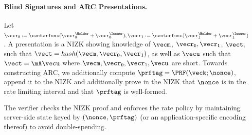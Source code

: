 	
	
\paragraph{Blind Signatures and ARC Presentations.}
Let $\vecr_0:=\centerfunc(\vecr_0^\Holder+\vecr_0^\Issuer),\vecr_1:=\centerfunc(\vecr_1^\Holder+\vecr_1^\Issuer)$. A presentation is a NIZK showing knowledge of $\vecm$, $\vecr_0,\vecr_1$, $\vect$,  such that  $\vect=hash(\vecm,\vecr_0,\vecr_1)$, as well as $\vecu$ such that $\vect =\mA \vecu$ where $\vecm,\vecr_0,\vecr_1,\vecu$ are short. Towards constructing ARC, we additionally compute $\prftag=\PRF(\veck;\nonce)$, append it to the NIZK and additionally prove in the NIZK that $\nonce$ is in the rate limiting interval and that $\prftag$ is well-formed.
	

The verifier checks the NIZK proof and enforces the rate policy by maintaining server-side state keyed by
\((\nonce,\prftag)\) (or an application-specific encoding thereof) to avoid double-spending.

